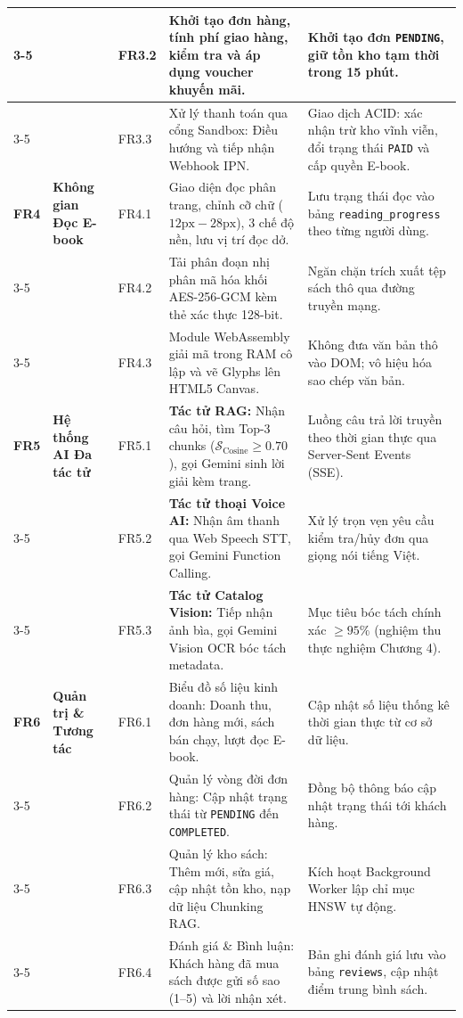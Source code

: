 \documentclass[11pt, a4paper]{report}
\begin{document}
\begin{longtable}{p{1.0cm} p{3.0cm} p{1.0cm} p{5.0cm} p{4.0cm}}
\cmidrule{3-5}
& & FR3.2 & Khởi tạo đơn hàng, tính phí giao hàng, kiểm tra và áp dụng voucher khuyến mãi. & Khởi tạo đơn \texttt{PENDING}, giữ tồn kho tạm thời trong 15 phút. \\
\cmidrule{3-5}
& & FR3.3 & Xử lý thanh toán qua cổng Sandbox: Điều hướng và tiếp nhận Webhook IPN. & Giao dịch ACID: xác nhận trừ kho vĩnh viễn, đổi trạng thái \texttt{PAID} và cấp quyền E-book. \\
\midrule
\textbf{FR4} & \textbf{Không gian Đọc E-book} & FR4.1 & Giao diện đọc phân trang, chỉnh cỡ chữ ($12\text{px} - 28\text{px}$), 3 chế độ nền, lưu vị trí đọc dở. & Lưu trạng thái đọc vào bảng \texttt{reading\_progress} theo từng người dùng. \\
\cmidrule{3-5}
& & FR4.2 & Tải phân đoạn nhị phân mã hóa khối AES-256-GCM kèm thẻ xác thực 128-bit. & Ngăn chặn trích xuất tệp sách thô qua đường truyền mạng. \\
\cmidrule{3-5}
& & FR4.3 & Module WebAssembly giải mã trong RAM cô lập và vẽ Glyphs lên HTML5 Canvas. & Không đưa văn bản thô vào DOM; vô hiệu hóa sao chép văn bản. \\
\midrule
\textbf{FR5} & \textbf{Hệ thống AI Đa tác tử} & FR5.1 & \textbf{Tác tử RAG:} Nhận câu hỏi, tìm Top-3 chunks ($\mathcal{S}_{\text{Cosine}} \ge 0.70$), gọi Gemini sinh lời giải kèm trang. & Luồng câu trả lời truyền theo thời gian thực qua Server-Sent Events (SSE). \\
\cmidrule{3-5}
& & FR5.2 & \textbf{Tác tử thoại Voice AI:} Nhận âm thanh qua Web Speech STT, gọi Gemini Function Calling. & Xử lý trọn vẹn yêu cầu kiểm tra/hủy đơn qua giọng nói tiếng Việt. \\
\cmidrule{3-5}
& & FR5.3 & \textbf{Tác tử Catalog Vision:} Tiếp nhận ảnh bìa, gọi Gemini Vision OCR bóc tách metadata. & Mục tiêu bóc tách chính xác $\ge 95\%$ (nghiệm thu thực nghiệm Chương 4). \\
\midrule
\textbf{FR6} & \textbf{Quản trị \& Tương tác} & FR6.1 & Biểu đồ số liệu kinh doanh: Doanh thu, đơn hàng mới, sách bán chạy, lượt đọc E-book. & Cập nhật số liệu thống kê thời gian thực từ cơ sở dữ liệu. \\
\cmidrule{3-5}
& & FR6.2 & Quản lý vòng đời đơn hàng: Cập nhật trạng thái từ \texttt{PENDING} đến \texttt{COMPLETED}. & Đồng bộ thông báo cập nhật trạng thái tới khách hàng. \\
\cmidrule{3-5}
& & FR6.3 & Quản lý kho sách: Thêm mới, sửa giá, cập nhật tồn kho, nạp dữ liệu Chunking RAG. & Kích hoạt Background Worker lập chỉ mục HNSW tự động. \\
\cmidrule{3-5}
& & FR6.4 & Đánh giá \& Bình luận: Khách hàng đã mua sách được gửi số sao (1--5) và lời nhận xét. & Bản ghi đánh giá lưu vào bảng \texttt{reviews}, cập nhật điểm trung bình sách. \\
\bottomrule
\end{longtable}
\end{document}

